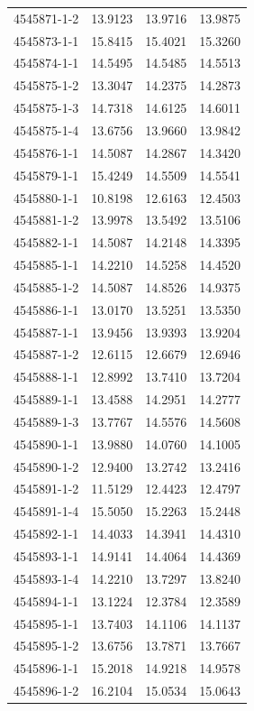 \begin{longtable}{lrrr}
4545871-1-2 & 13.9123 & 13.9716 & 13.9875 \\
4545873-1-1 & 15.8415 & 15.4021 & 15.3260 \\
4545874-1-1 & 14.5495 & 14.5485 & 14.5513 \\
4545875-1-2 & 13.3047 & 14.2375 & 14.2873 \\
4545875-1-3 & 14.7318 & 14.6125 & 14.6011 \\
4545875-1-4 & 13.6756 & 13.9660 & 13.9842 \\
4545876-1-1 & 14.5087 & 14.2867 & 14.3420 \\
4545879-1-1 & 15.4249 & 14.5509 & 14.5541 \\
4545880-1-1 & 10.8198 & 12.6163 & 12.4503 \\
4545881-1-2 & 13.9978 & 13.5492 & 13.5106 \\
4545882-1-1 & 14.5087 & 14.2148 & 14.3395 \\
4545885-1-1 & 14.2210 & 14.5258 & 14.4520 \\
4545885-1-2 & 14.5087 & 14.8526 & 14.9375 \\
4545886-1-1 & 13.0170 & 13.5251 & 13.5350 \\
4545887-1-1 & 13.9456 & 13.9393 & 13.9204 \\
4545887-1-2 & 12.6115 & 12.6679 & 12.6946 \\
4545888-1-1 & 12.8992 & 13.7410 & 13.7204 \\
4545889-1-1 & 13.4588 & 14.2951 & 14.2777 \\
4545889-1-3 & 13.7767 & 14.5576 & 14.5608 \\
4545890-1-1 & 13.9880 & 14.0760 & 14.1005 \\
4545890-1-2 & 12.9400 & 13.2742 & 13.2416 \\
4545891-1-2 & 11.5129 & 12.4423 & 12.4797 \\
4545891-1-4 & 15.5050 & 15.2263 & 15.2448 \\
4545892-1-1 & 14.4033 & 14.3941 & 14.4310 \\
4545893-1-1 & 14.9141 & 14.4064 & 14.4369 \\
4545893-1-4 & 14.2210 & 13.7297 & 13.8240 \\
4545894-1-1 & 13.1224 & 12.3784 & 12.3589 \\
4545895-1-1 & 13.7403 & 14.1106 & 14.1137 \\
4545895-1-2 & 13.6756 & 13.7871 & 13.7667 \\
4545896-1-1 & 15.2018 & 14.9218 & 14.9578 \\
4545896-1-2 & 16.2104 & 15.0534 & 15.0643 \\

\end{longtable}
